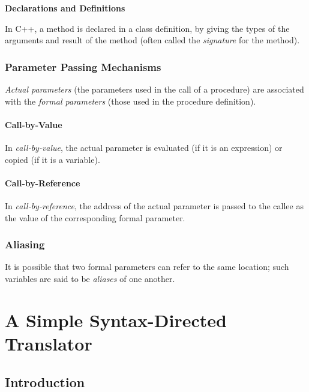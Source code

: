 \documentclass[12pt,a4paper,twoside,openany]{book}
\begin{document}
\begin{framed}
    \begin{center}
        \textbf{{\large Declarations and Definitions}}
    \end{center}

    In C++, a method is declared in a class definition, by giving the types of the arguments and result of the method (often called the \textit{signature} for the method).
\end{framed}

\subsection{Parameter Passing Mechanisms}

\textit{Actual parameters} (the parameters used in the call of a procedure) are associated with the \textit{formal parameters} (those used in the procedure definition).

\subsubsection{Call-by-Value}

In \textit{call-by-value}, the actual parameter is evaluated (if it is an expression) or copied (if it is a variable).

\subsubsection{Call-by-Reference}

In \textit{call-by-reference}, the address of the actual parameter is passed to the callee as the value of the corresponding formal parameter.

\subsection{Aliasing}

It is possible that two formal parameters can refer to the same location; such variables are said to be \textit{aliases} of one another.

\chapter{A Simple Syntax-Directed Translator}
\section{Introduction} 
\end{document}
